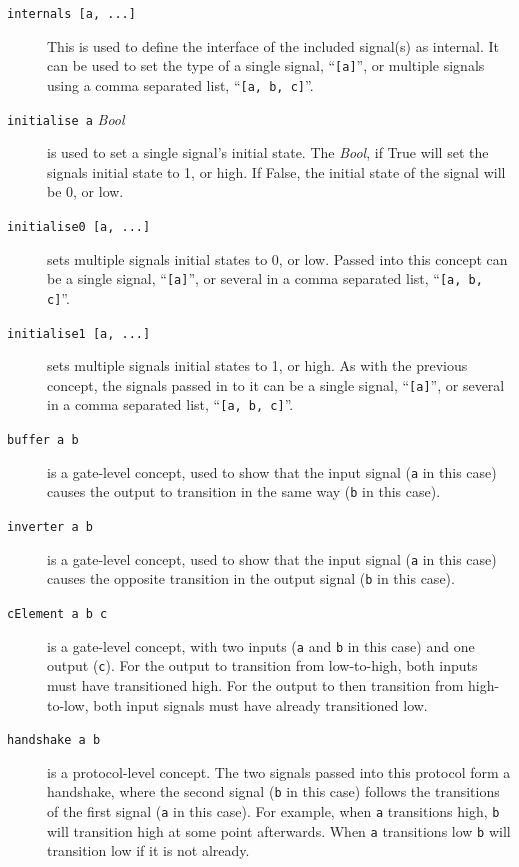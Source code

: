 \documentclass{proc}
\begin{document}
\begin{description}
   \item [\texttt{internals [a, ...]}] This is used to define the interface of the included signal(s) as internal. It can be used to set the type of a single signal, ``\texttt{[a]}'', or multiple 
   signals using a comma separated list, ``\texttt{[a, b, c]}''.
  
  \item [\texttt{initialise a} \emph{Bool}] is used to set a single signal's initial state. The \emph{Bool}, if True will set the signals initial state to 1, or high. If False, the initial state of the 
  signal will be 0, or low. 

  \item [\texttt{initialise0 [a, ...]}] sets multiple signals initial states to 0, or low. Passed into this concept can be a single signal, ``\texttt{[a]}'', or several in a comma separated list, 
  ``\texttt{[a, b, c]}''.
  
  \item [\texttt{initialise1 [a, ...]}] sets multiple signals initial states to 1, or high. As with the previous concept, the signals passed in to it can be a single signal, ``\texttt{[a]}'', or several 
in a comma separated list, ``\texttt{[a, b, c]}''.
  
  \item [\texttt{buffer a b}] is a gate-level concept, used to show that the input signal (\texttt{a} in this case) causes the output to transition in the same way (\texttt{b} in this case). 
  
  \item [\texttt{inverter a b}] is a gate-level concept, used to show that the input signal (\texttt{a} in this case) causes the opposite transition in the output signal (\texttt{b} in this case).
  
  \item [\texttt{cElement a b c}] is a gate-level concept, with two inputs (\texttt{a} and \texttt{b} in this case) and one output (\texttt{c}). For the output to transition from low-to-high, 
  both inputs must have transitioned high. For the output to then transition from high-to-low, both input signals must have already transitioned low.
  
  \item [\texttt{handshake a b}] is a protocol-level concept. The two signals passed into this protocol form a handshake, where the second signal (\texttt{b} in this case) follows the 
  transitions of the first signal (\texttt{a} in this case). For example, when \texttt{a} transitions high, \texttt{b} will transition high at some point afterwards. When \texttt{a} transitions 
  low \texttt{b} will transition low if it is not already.
  

\end{description}
\end{document}
